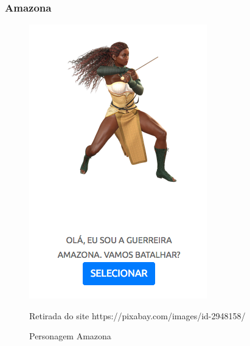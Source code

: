 \subsubsection{Amazona}
\begin{figure}[h]
	\centering
	\includegraphics[keepaspectratio=true,scale=0.6]{figuras/amazona.png}
	\caption{Personagem Amazona}
	Retirada do site https://pixabay.com/images/id-2948158/
	\label{amazona}
\end{figure}
\clearpage
